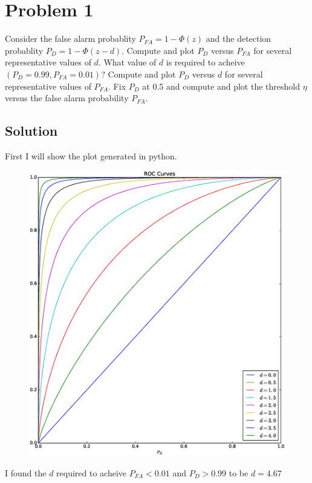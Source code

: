 \documentclass[a4paper]{article}
\begin{document}
\section*{Problem 1}%
Consider the false alarm probablity $P_{FA} = 1 - \Phi(z)$ and the detection probablity $P_D = 1 - \Phi(z-d)$. Compute and plot $P_D$ versus $P_{FA}$ for several representative values of $d$. What value of $d$ is required to acheive $(P_D = 0.99, P_{FA} = 0.01)$? Compute and plot $P_D$ versus $d$ for several representative values of $P_{FA}$. Fix $P_D$ at 0.5 and compute and plot the threshold $\eta$ versus the false alarm probability $P_{FA}$.

\subsection*{Solution}%
First I will show the plot generated in python. 

\begin{figure}[H]
\begin{center}
  \includegraphics[scale=0.5]{hw5-1-1.eps}
\end{center}
\end{figure}

I found the $d$ required to acheive $P_{FA} < 0.01$ and $P_{D} > 0.99$ to be $d = 4.67$
\end{document}
